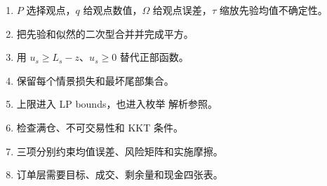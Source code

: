 \begin{enumerate}[leftmargin=*]
  \item $P$ 选择观点，$q$ 给观点数值，$\Omega$ 给观点误差，$\tau$ 缩放先验均值不确定性。
  \item 把先验和似然的二次型合并并完成平方。
  \item 用 $u_s\ge L_s-z$、$u_s\ge0$ 替代正部函数。
  \item 保留每个情景损失和最坏尾部集合。
  \item 上限进入 LP bounds，也进入枚举 解析参照。
  \item 检查满仓、不可交易性和 KKT 条件。
  \item 三项分别约束均值误差、风险矩阵和实施摩擦。
  \item 订单层需要目标、成交、剩余量和现金四张表。
\end{enumerate}


\MFQMappedPortfolioOptimizationHints
